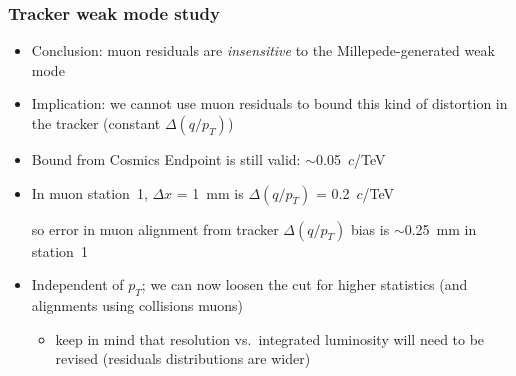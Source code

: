 \documentclass[compress]{beamer}
\begin{document}
\begin{frame}
\frametitle{Tracker weak mode study}
\begin{itemize}\setlength{\itemsep}{0.25 cm}
\item Conclusion: muon residuals are {\it insensitive} to the
  Millepede-generated weak mode

\item Implication: we cannot use muon residuals to bound this kind of
  distortion in the tracker (constant $\Delta(q/p_T)$)

\item Bound from Cosmics Endpoint is still valid: $\sim$0.05~$c$/TeV

\item In muon station~1, $\Delta x$ = 1~mm is $\Delta(q/p_T)$ = 0.2~$c$/TeV

so error in muon alignment from tracker $\Delta(q/p_T)$ bias is $\sim$0.25~mm in station~1

\item Independent of $p_T$; we can now loosen the cut for higher
  statistics (and alignments using collisions muons)
\begin{itemize}
\item keep in mind that resolution vs.\ integrated luminosity will need to be revised (residuals distributions are wider)
\end{itemize}
\end{itemize}
\end{frame}
\end{document}
